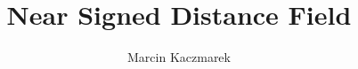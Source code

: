 \documentclass[a4paper,12pt]{article}
\title{\textbf{Near Signed Distance Field}}
\author{Marcin Kaczmarek}
\date{}
\begin{document}
\maketitle



\cite{green07}


\end{document}
